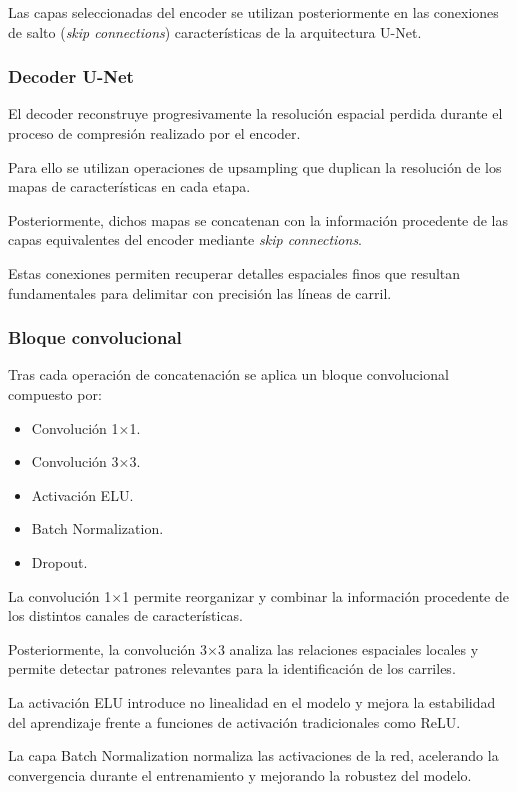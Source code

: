 \documentclass[12pt, a4paper]{article}
\begin{document}
Las capas seleccionadas del encoder se utilizan posteriormente en las conexiones de salto (\textit{skip connections}) características de la arquitectura U-Net.

\subsubsection{Decoder U-Net}
El decoder reconstruye progresivamente la resolución espacial perdida durante el proceso de compresión realizado por el encoder.

Para ello se utilizan operaciones de upsampling que duplican la resolución de los mapas de características en cada etapa.

Posteriormente, dichos mapas se concatenan con la información procedente de las capas equivalentes del encoder mediante \textit{skip connections}.

Estas conexiones permiten recuperar detalles espaciales finos que resultan fundamentales para delimitar con precisión las líneas de carril.

\subsubsection{Bloque convolucional}
Tras cada operación de concatenación se aplica un bloque convolucional compuesto por:

\begin{itemize}
    \item Convolución 1×1.
    \item Convolución 3×3.
    \item Activación ELU.
    \item Batch Normalization.
    \item Dropout.
\end{itemize}

La convolución 1×1 permite reorganizar y combinar la información procedente de los distintos canales de características.

Posteriormente, la convolución 3×3 analiza las relaciones espaciales locales y permite detectar patrones relevantes para la identificación de los carriles.

La activación ELU introduce no linealidad en el modelo y mejora la estabilidad del aprendizaje frente a funciones de activación tradicionales como ReLU.

La capa Batch Normalization normaliza las activaciones de la red, acelerando la convergencia durante el entrenamiento y mejorando la robustez del modelo.
\end{document}
